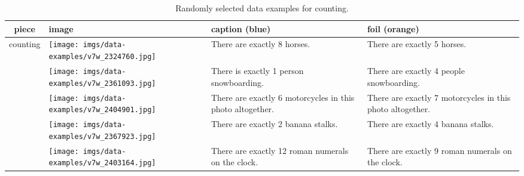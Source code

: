 \documentclass[11pt]{article}
\newcommand{\gr}[1]{\textcolor{niceblue}{#1}}
\newcommand\red[1]{\textcolor{niceorange}{#1}}
\begin{document}
\begin{table*}[t]
    \small
    \centering
    
\begin{tabular}{cp{.3\linewidth}b{.25\linewidth}b{.25\linewidth}}
      \toprule
    \bf piece & \bf image & \bf caption (\gr{blue}) & \bf foil (\red{orange}) \\
    \midrule
    \multirow{5}{*}{counting} & \texttt{[image: imgs/data-examples/v7w\_2324760.jpg]}
      & There are exactly \gr{8} horses. & There are exactly \red{5} horses. \\
      \cmidrule{2-4}
      & \texttt{[image: imgs/data-examples/v7w\_2361093.jpg]}
      & There is exactly \gr{1} person snowboarding. & There are exactly \red{4} people snowboarding. \\
      \cmidrule{2-4}
      & \texttt{[image: imgs/data-examples/v7w\_2404901.jpg]}
      & There are exactly \gr{6} motorcycles in this photo altogether. & There are exactly \red{7} motorcycles in this photo altogether. \\
      \cmidrule{2-4}
      & \texttt{[image: imgs/data-examples/v7w\_2367923.jpg]}
      & There are exactly \gr{2} banana stalks. & There are exactly \red{4} banana stalks. \\
      \cmidrule{2-4}
    & \texttt{[image: imgs/data-examples/v7w\_2403164.jpg]}
      & There are exactly \gr{12} roman numerals on the clock. & There are exactly \red{9} roman numerals on the clock. \\
      \bottomrule
    \end{tabular}
\caption{Randomly selected data examples for counting.}
    \label{tab:counting-examples}
\end{table*}
\end{document}
